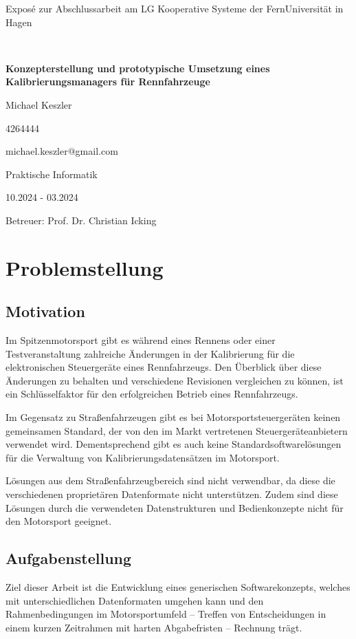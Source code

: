 \documentclass[12pt]{article} %
\begin{document}
\begin{center}
  \baselineskip

  Exposé zur Abschlussarbeit am LG Kooperative Systeme der FernUniversität in Hagen

  ~

  {\LARGE\bfseries
  Konzepterstellung und prototypische Umsetzung eines Kalibrierungsmanagers für Rennfahrzeuge}

  \large
  Michael Keszler

  4264444

  michael.keszler@gmail.com

  Praktische Informatik

  10.2024 - 03.2024

  Betreuer: Prof. Dr. Christian Icking
\end{center}

\section{Problemstellung}

\subsection{Motivation}
Im Spitzenmotorsport gibt es während eines Rennens oder einer Testveranstaltung zahlreiche Änderungen in der Kalibrierung für die elektronischen Steuergeräte eines Rennfahrzeugs. Den Überblick über diese Änderungen zu behalten und verschiedene Revisionen vergleichen zu können, ist ein Schlüsselfaktor für den erfolgreichen Betrieb eines Rennfahrzeugs.

Im Gegensatz zu Straßenfahrzeugen gibt es bei Motorsportsteuergeräten keinen gemeinsamen Standard, der von den im Markt vertretenen Steuergeräteanbietern verwendet wird. Dementsprechend gibt es auch keine Standardsoftwarelösungen für die Verwaltung von Kalibrierungsdatensätzen im Motorsport.

Lösungen aus dem Straßenfahrzeugbereich sind nicht verwendbar, da diese die verschiedenen proprietären Datenformate nicht unterstützen. Zudem sind diese Lösungen durch die verwendeten Datenstrukturen und Bedienkonzepte nicht für den Motorsport geeignet.

\subsection{Aufgabenstellung}
Ziel dieser Arbeit ist die Entwicklung eines generischen Softwarekonzepts, welches mit unterschiedlichen Datenformaten umgehen kann und den Rahmenbedingungen im Motorsportumfeld – Treffen von Entscheidungen in einem kurzen Zeitrahmen mit harten Abgabefristen – Rechnung trägt.
\end{document}
